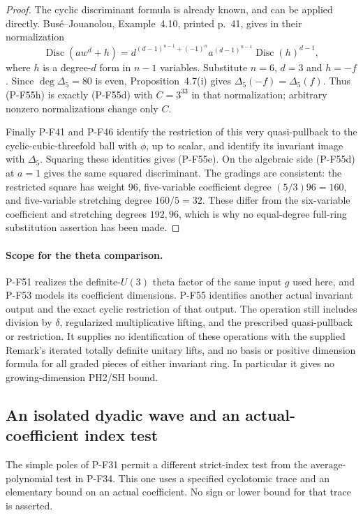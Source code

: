 \documentclass[11pt,a4paper]{article}
\begin{document}
\begin{proof}
The cyclic discriminant formula is already known, and can
be applied directly. Bus\'e--Jouanolou, Example~4.10,
printed p.~41, gives in their normalization
\[
 \operatorname{Disc}(a w^d+h)
   =d^{(d-1)^{n-1}+(-1)^n}
       a^{(d-1)^{n-1}}\operatorname{Disc}(h)^{d-1},
 \tag{P-F55h}
\]
where $h$ is a degree-$d$ form in $n-1$ variables.
Substitute $n=6$, $d=3$ and $h=-f$.
Since $\deg\Delta_5=80$ is even, Proposition~4.7(i)
gives $\Delta_5(-f)=\Delta_5(f)$. Thus (P-F55h)
is exactly (P-F55d) with $C=3^{33}$ in that normalization;
arbitrary nonzero normalizations change only $C$.

Finally P-F41 and P-F46 identify the restriction of this very
quasi-pullback to the cyclic-cubic-threefold ball with $\phi$,
up to scalar, and identify its invariant image with $\Delta_5$.
Squaring these identities gives (P-F55e). On the algebraic
side (P-F55d) at $a=1$ gives the same squared discriminant.
The gradings are consistent: the restricted square has weight
$96$, five-variable coefficient degree $(5/3)96=160$, and
five-variable stretching degree $160/5=32$.
These differ from the six-variable coefficient and stretching
degrees $192,96$, which is why no equal-degree full-ring
substitution assertion has been made.
\end{proof}

\paragraph{Scope for the theta comparison.}
P-F51 realizes the definite-$U(3)$ theta factor of the same
input $g$ used here, and P-F53 models its coefficient dimensions.
P-F55 identifies another actual invariant output and the exact
cyclic restriction of that output. The operation still includes
division by $\delta$, regularized multiplicative lifting, and
the prescribed quasi-pullback or restriction. It supplies no
identification of these operations with the supplied Remark's
iterated totally definite unitary lifts, and no basis or positive
dimension formula for all graded pieces of either invariant
ring. In particular it gives no growing-dimension PH2/SH bound.


\subsection{An isolated dyadic wave and an actual-coefficient index test}

The simple poles of P-F31 permit a different strict-index test from
the average-polynomial test in P-F34. This one uses a specified
cyclotomic trace and an elementary bound on an actual coefficient.
No sign or lower bound for that trace is asserted.
\end{document}
